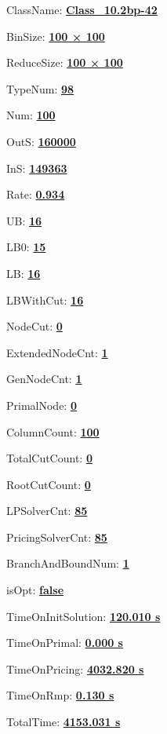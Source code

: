 \documentclass[11pt]{article}
\begin{document}
\pagestyle{empty}


ClassName: \underline{\textbf{Class_10.2bp-42}}
\par
BinSize: \underline{\textbf{100 × 100}}
\par
ReduceSize: \underline{\textbf{100 × 100}}
\par
TypeNum: \underline{\textbf{98}}
\par
Num: \underline{\textbf{100}}
\par
OutS: \underline{\textbf{160000}}
\par
InS: \underline{\textbf{149363}}
\par
Rate: \underline{\textbf{0.934}}
\par
UB: \underline{\textbf{16}}
\par
LB0: \underline{\textbf{15}}
\par
LB: \underline{\textbf{16}}
\par
LBWithCut: \underline{\textbf{16}}
\par
NodeCut: \underline{\textbf{0}}
\par
ExtendedNodeCnt: \underline{\textbf{1}}
\par
GenNodeCnt: \underline{\textbf{1}}
\par
PrimalNode: \underline{\textbf{0}}
\par
ColumnCount: \underline{\textbf{100}}
\par
TotalCutCount: \underline{\textbf{0}}
\par
RootCutCount: \underline{\textbf{0}}
\par
LPSolverCnt: \underline{\textbf{85}}
\par
PricingSolverCnt: \underline{\textbf{85}}
\par
BranchAndBoundNum: \underline{\textbf{1}}
\par
isOpt: \underline{\textbf{false}}
\par
TimeOnInitSolution: \underline{\textbf{120.010 s}}
\par
TimeOnPrimal: \underline{\textbf{0.000 s}}
\par
TimeOnPricing: \underline{\textbf{4032.820 s}}
\par
TimeOnRmp: \underline{\textbf{0.130 s}}
\par
TotalTime: \underline{\textbf{4153.031 s}}
\par
\newpage


\end{document}
